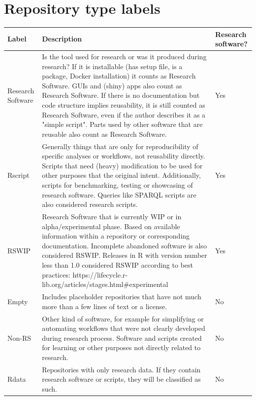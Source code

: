 \chapter{Repository type labels}
\label{AppendixB}


{\setlength\LTleft{-1.25cm}
\setlength\LTright{-1cm}
\begin{longtable}{@{\extracolsep{\fill}} p{2cm}   p{14.5cm}  p{1.5cm}}
\textbf{Label} & \textbf{Description} &  \textbf{Research software?} \\
\hline
\hline
Research Software & Is the tool used for research or was it produced during research? If it is installable (has setup file, is a package, Docker installation) it counts as Research Software. GUIs and (shiny) apps also   count as Research Software. If there is no documentation but code structure implies reusability,   it is still counted as Research Software, even if the author describes it as a "simple   script". Parts used by other software that are reusable also count as   Research Software. & Yes \\
\hline
Rscript & Generally things that are only   for reproducibility of specific analyses or workflows, not reusability   directly. Scripts that need (heavy) modification to be used for other   purposes that the original intent. Additionally, scripts for benchmarking,   testing or showcasing of research software. Queries like SPARQL scripts are   also considered research scripts. & Yes \\
\hline
RSWIP & Research Software that is currently WIP or in   alpha/experimental phase. Based on available information within a repository   or corresponding documentation. Incomplete abandoned software is also   considered RSWIP. Releases in R with version number less than 1.0 considered   RSWIP according to best practices:   https://lifecycle.r-lib.org/articles/stages.html\#experimental & Yes \\
\hline
Empty & Includes placeholder   repositories that have not much more than a few lines of text or a license. & No \\
\hline
Non-RS & Other kind of software, for   example for simplifying or automating workflows that were not clearly   developed during research process. Software and scripts created for learning   or other purposes not directly related to research. & No \\
\hline
Rdata & Repositories with only research   data. If they contain research software or scripts, they will be classified   as such. & No \\

\end{longtable}}
